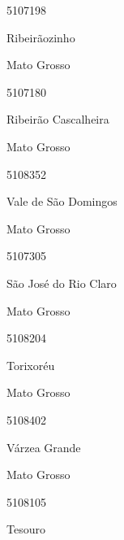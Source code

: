 \documentclass[
  letterpaper,
]{report}
\begin{document}
\n      

5107198

\n      

Ribeirãozinho

\n    

\n    

\n      

Mato Grosso

\n      

5107180

\n      

Ribeirão Cascalheira

\n    

\n    

\n      

Mato Grosso

\n      

5108352

\n      

Vale de São Domingos

\n    

\n    

\n      

Mato Grosso

\n      

5107305

\n      

São José do Rio Claro

\n    

\n    

\n      

Mato Grosso

\n      

5108204

\n      

Torixoréu

\n    

\n    

\n      

Mato Grosso

\n      

5108402

\n      

Várzea Grande

\n    

\n    

\n      

Mato Grosso

\n      

5108105

\n      

Tesouro
\end{document}
